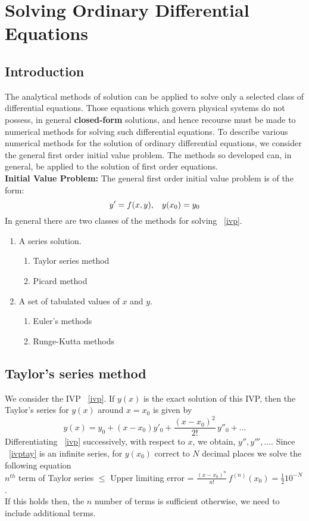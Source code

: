 \documentclass[aima203_lecturenotes_ku.tex]{subfiles}
\begin{document}
\chapter{Solving Ordinary Differential Equations}
\section{Introduction}
The analytical methods of solution can be applied to solve only a selected class of differential equations. Those equations which govern physical systems do not possess, in general \textbf{closed-form} solutions, and hence recourse must be made to numerical methods for solving such differential equations. To describe various numerical methods for the solution of ordinary differential equations, we consider the general first order initial value problem. The methods so developed can, in general, be applied to the solution of first order equations.\\[2mm]
\textbf{Initial Value Problem:} \hspace{3mm} The general first order initial value problem is of the form:
\begin{equation}
  \label{ivp}
y' = f(x,y), \hspace{3mm} y(x_0) = y_0
\end{equation}
In general there are two classes of the methods for solving ~\ref{ivp}.
\begin{enumerate}
\item A series solution.
  \begin{enumerate}
  \item Taylor series method
  \item Picard method
  \end{enumerate}
\item A set of tabulated values of $x$ and $y$.
  \begin{enumerate}
  \item Euler's methods
    \item Runge-Kutta methods
  \end{enumerate}
\end{enumerate}

\section{Taylor's series method}
We consider the IVP ~\ref{ivp}. If $y(x)$ is the exact solution of this IVP, then the Taylor's series for $y(x)$ around $x=x_0$ is given by
\begin{equation}
  \label{ivptay}
  y(x) = y_0 + (x-x_0)y'_0 + \frac{(x-x_0)^2}{2!}\, y''_0 + ...
\end{equation}
Differentiating ~\ref{ivp} successively, with respect to $x$, we obtain, $y'', y''', ...$. Since ~\ref{ivptay} is an infinite series, for $y(x_0)$ correct to $N$ decimal places we solve the following equation \\
$n^{th}$ term of Taylor series $\leq$ Upper limiting error = $\displaystyle \frac{(x-x_0)^n}{n!} \, f^{(n)} (x_0) = \frac{1}{2} 10^{-N}$. \\[1mm]
If this holds then, the $n$ number of terms is sufficient otherwise, we need to include additional terms.
\end{document}
